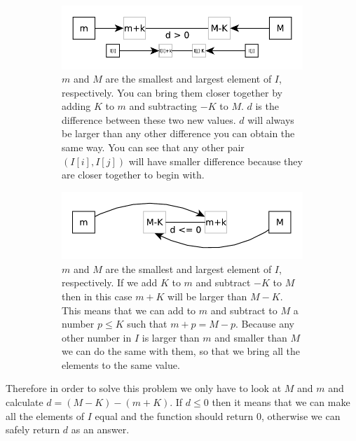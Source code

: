 \begin{figure}
	\vspace*{-0.5in}
	\centering
	\begin{subfigure}[t]{0.90\textwidth}
		\includegraphics[width=\textwidth]{sources/smallest_range/images/explanation1} 
		\caption{$m$ and $M$ are the smallest and largest element of $I$, respectively. 
		You can bring them closer together by adding $K$ to $m$ and subtracting $-K$ to $M$. $d$ is the difference between these two new values. $d$ will always be larger than any other difference you can obtain the same way. 
		You can see that any other pair $(I[i], I[j])$ will have smaller difference because they are closer together to begin with.}
		\label{fig:smallest_range:explanation1} 
	 \end{subfigure}
	\hfill
	\begin{subfigure}[t]{0.90\textwidth}
		\includegraphics[width=\textwidth]{sources/smallest_range/images/explanation2} 
		\caption{$m$ and $M$ are the smallest and largest element of $I$, respectively. 
		If we  add $K$ to $m$ and subtract $-K$ to $M$ then in this case $m+K$ will be larger than $M-K$. This means that we can add to $m$ and subtract to $M$
		a number $p \leq K$ such that $m+p = M-p$. Because any other number in $I$ is larger than $m$ and smaller than $M$ we can do the same with them, so that we bring all the elements to the same value.}
		\label{fig:smallest_range:explanation2} 
	 \end{subfigure}
	 \hfill
	 \label{}
	 \caption{}
\end{figure}
Therefore in order to solve this problem we only have to look at $M$ and $m$ and calculate $d=(M-K)-(m+K)$.
If $d \leq 0$ then it means that we can make all the elements of $I$ equal and the function should return $0$, otherwise we can safely return $d$ as an answer.

